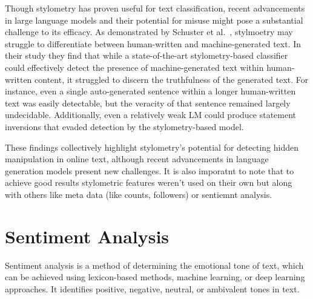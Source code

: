 \documentclass[twoside]{ctuthesis}
\theoremstyle{plain}
\theoremstyle{definition}
\theoremstyle{note}
\begin{document}

Though stylometry has proven useful for text classification, recent advancements in large language models and their potential for misuse might pose a substantial challenge to its efficacy. As demonstrated by Schuster et al.~\cite{Schuster2020}, stylmoetry may struggle to differentiate between human-written and machine-generated text. In their study they find that while a state-of-the-art stylometry-based classifier could effectively detect the presence of machine-generated text within human-written content, it struggled to discern the truthfulness of the generated text.  For instance, even a single auto-generated sentence within a longer human-written text was easily detectable, but the veracity of that sentence remained largely undecidable.  Additionally, even a relatively weak LM could produce statement inversions that evaded detection by the stylometry-based model.\par

These findings collectively highlight stylometry's potential for detecting hidden manipulation in online text, although recent advancements in language generation models present new challenges. It is also imporatnt to note that to achieve good results stylometric features weren't used on their own but along with others like meta data (like counts, followers) or sentiemnt analysis. \par

\section{Sentiment Analysis}
Sentiment analysis is a method of determining the emotional tone of text, which can be achieved using lexicon-based methods, machine learning, or deep learning approaches. It identifies positive, negative, neutral, or ambivalent tones in text.\par
\end{document}
